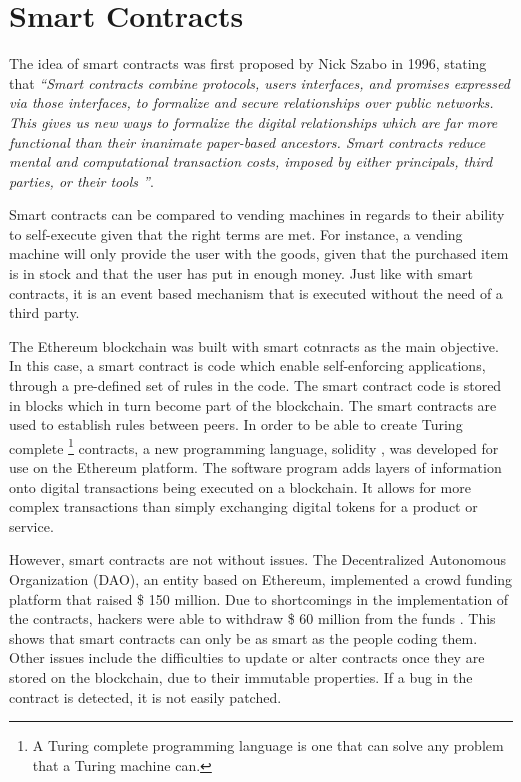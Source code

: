 \section{Smart Contracts}
The idea of smart contracts was first proposed by Nick Szabo in 1996, stating that \textit{\enquote{Smart contracts combine protocols, users interfaces, and promises expressed via those interfaces, to formalize and secure relationships over public networks. This gives us new ways to formalize the digital relationships which are far more functional than their inanimate paper-based ancestors. Smart contracts reduce mental and computational transaction costs, imposed by either principals, third parties, or their tools  \cite{szabo}}}.

Smart contracts can be compared to vending machines in regards to their ability to self-execute given that the right terms are met. For instance, a vending machine will only provide the user with the goods, given that the purchased item is in stock and that the user has put in enough money. Just like with smart contracts, it is an event based mechanism that is executed without the need of a third party. 

The Ethereum blockchain was built with smart cotnracts as the main objective. In this case, a smart contract is code which enable self-enforcing applications, through a pre-defined set of rules in the code. The smart contract code is stored in blocks which in turn become part of the blockchain. The smart contracts are used to establish rules between peers. In order to be able to create Turing complete \footnote{A Turing complete programming language is one that can solve any problem that a Turing machine can.} contracts, a new programming language, solidity \cite{ethereum_docs}, was developed for use on the Ethereum platform. The software program adds layers of information onto digital transactions being executed on a blockchain. It allows for more complex transactions than simply exchanging digital tokens for a product or service.

However, smart contracts are not without issues. The Decentralized Autonomous Organization (DAO), an entity based on Ethereum, implemented a crowd funding platform that raised \$ 150 million. Due to shortcomings in the implementation of the contracts, hackers were able to withdraw \$ 60 million from the funds \cite{dao}. This shows that smart contracts can only be as smart as the people coding them. Other issues include the difficulties to update or alter contracts once they are stored on the blockchain, due to their immutable properties. If a bug in the contract is detected, it is not easily patched.   

